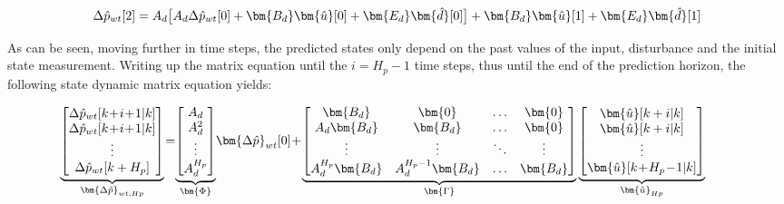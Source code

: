 \begin{equation}
	\Delta \hat p_{wt}[2] = A_d\big[A_d\Delta \hat p_{wt}[0] + \bm{B_d}  \bm{\hat{u}}[0] + \bm{E_d}  \bm{\hat{d}}[0]\big] + \bm{B_d} \bm{\hat{u}}[1] + \bm{E_d} \bm{\hat{d}}[1]\\ 
\end{equation}

As can be seen, moving further in time steps, the predicted states only depend on the past values of the input, disturbance and the initial state measurement. Writing up the matrix equation until the $i = H_p - 1$ time steps, thus until the end of the prediction horizon, the following state dynamic matrix equation yields:

\begin{align}\hspace{-0.8cm}
\underbrace{\begin{bmatrix}
\Delta \hat p_{wt}[k\!+\!i\!+\!1|k] \\ 
\Delta \hat p_{wt}[k\!+\!i\!+\!1|k]\\ 
\vdots \\ 
\Delta \hat p_{wt}[k+H_p]\\ 
\end{bmatrix}}_{\bm{\Delta \hat{p}}_{wt,Hp}}
\!=\!
&\underbrace{\begin{bmatrix}
A_d \\ 
A_d^2\\ 
\vdots \\ 
A_d^{H_p}\\ 
\end{bmatrix}}_{\bm{\Phi}}
\!\bm{\Delta \hat{p}}_{wt}[0]\!+\!\nonumber
\underbrace{\begin{bmatrix}
 \bm{B_d}         & \bm{0}                &\hdots & \bm{0}\\ 
 A_d\bm{B_d}      &  \bm{B_d}             &\hdots & \bm{0}\\ 
\vdots            &\vdots                 &\ddots  & \vdots\\ 
 A_d^{H_p}\bm{B_d}& A_d^{H_p-1}\bm{B_d}   &\hdots & \bm{B_d}
\end{bmatrix}}_{\bm{\Gamma}}
\underbrace{\begin{bmatrix}
 \bm{\hat{u}}[k+i|k] \\ 
 \bm{\hat{u}}[k+i|k]\\ 
\vdots \\ 
 \bm{\hat{u}}[k\!+\!H_p\!-\!1|k]\\ 
\end{bmatrix}}_{\bm{\hat{u}}_{Hp}} \\

\end{align}
